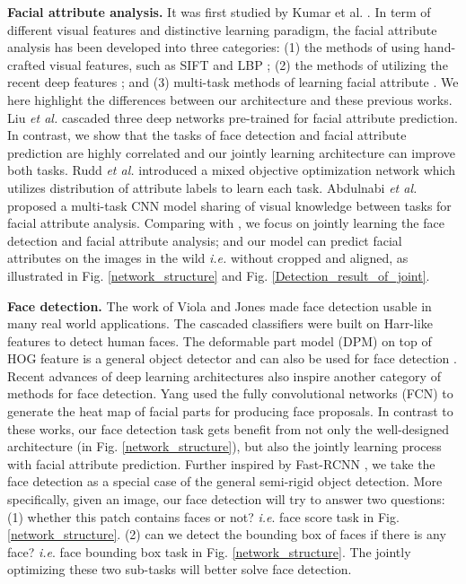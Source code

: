 \documentclass[10pt,twocolumn,letterpaper]{article}
\begin{document}
\noindent \textbf{Facial attribute analysis. }It was first studied
by Kumar et al. \cite{kumar2009attribute}. In term of different visual
features and distinctive learning paradigm, the facial attribute analysis
has been developed into three categories: (1) the methods \cite{kumar2009attribute}
of using hand-crafted visual features, such as SIFT \cite{lowe2004distinctive}
and LBP \cite{lbp_tpami}; (2) the methods of utilizing the recent
deep features \cite{liu2015deep,off_shelf_face,wang2016walk}; and
(3) multi-task methods of learning facial attribute \cite{abdulnabi2015multi,rudd2016moon}.
We here highlight the differences between our architecture and these
previous works. Liu \emph{et al.} \cite{liu2015deep} cascaded three
deep networks pre-trained for facial attribute prediction. In contrast,
we show that the tasks of face detection and facial attribute prediction
are highly correlated and our jointly learning architecture can improve
both tasks. Rudd \emph{et al.} \cite{rudd2016moon} introduced a mixed
objective optimization network which utilizes distribution
of attribute labels to learn each task.
Abdulnabi \emph{et al.} \cite{abdulnabi2015multi} proposed a multi-task
CNN model sharing of visual knowledge between tasks for facial attribute
analysis. Comparing with \cite{rudd2016moon,abdulnabi2015multi},
we focus on jointly learning the face detection and facial attribute
analysis; and our model can predict facial attributes on the images
in the wild \cite{rudd2016moon,wang2016walk}\emph{ i.e.} without
cropped and aligned, as illustrated in Fig. \ref{network_structure}
and Fig. \ref{Detection_result_of_joint}. 

\vspace{0.05in}

\noindent \textbf{Face detection.} The work of Viola and Jones \cite{viola2001rapid,viola2005multiple}
made face detection usable in many real world applications. The cascaded
classifiers were built on Harr-like features to detect human faces.
The deformable part model (DPM) \cite{felzenszwalb2010object} on
top of HOG feature is a general object detector and can also be used
for face detection \cite{dalal2005histograms}. Recent advances of
deep learning architectures also inspire another category of methods
for face detection. Yang \cite{yang_face} used the fully convolutional
networks (FCN) to generate the heat map of facial parts for producing
face proposals. In contrast to these works, our face detection task
gets benefit from not only the well-designed architecture (in Fig.
\ref{network_structure}), but also the jointly learning process with
facial attribute prediction. Further inspired by Fast-RCNN \cite{fast_rcnn,faster_rcnn},
we take the face detection as a special case of the general semi-rigid
object detection. More specifically, given an image, our face detection
will try to answer two questions: (1) whether this patch contains
faces or not? \emph{i.e}. face score task in Fig. \ref{network_structure}.
(2) can we detect the bounding box of faces if there is any face?
\emph{i.e}. face bounding box task in Fig. \ref{network_structure}.
The jointly optimizing these two sub-tasks will better solve face
detection.
\end{document}
